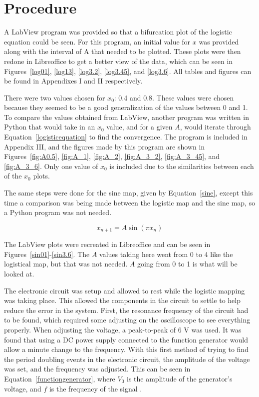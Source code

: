 \documentclass[12pt]{report}
\theoremstyle{definition}
\begin{document}
%
%

\section*{Procedure}

A LabView program was provided so that a bifurcation plot of the logistic equation could be seen. For this program, an initial value for $x$ was provided along with the interval of A that needed to be plotted. These plots were then redone in Libreoffice to get a better view of the data, which can be seen in Figures~\ref{log01}, \ref{log13}, \ref{log3.2}, \ref{log3.45}, and \ref{log3.6}. All tables and figures can be found in Appendixes I and II respectively. 

There were two values chosen for $x_0$: 0.4 and 0.8. These values were chosen because they seemed to be a good generalization of the values between 0 and 1. To compare the values obtained from LabView, another program was written in Python that would take in an $x_0$ value, and for a given $A$, would iterate through Equation~\ref{logisticequation} to find the convergence. The program is included in Appendix III, and the figures made by this program are shown in Figures~\ref{fig:A0.5}, \ref{fig:A_1}, \ref{fig:A_2}, \ref{fig:A_3_2}, \ref{fig:A_3_45}, and \ref{fig:A_3_6}. Only one value of $x_0$ is included due to the similarities between each of the $x_0$ plots.

The same steps were done for the sine map, given by Equation~\ref{sine}, except this time a comparison was being made between the logistic map  and the sine map, so a Python program was not needed. 

\begin{equation}
x_{n+1}=A\sin{(\pi x_n)}
\label{sine}
\end{equation}

The LabView plots were recreated in Libreoffice and can be seen in Figures~\ref{sin01}-\ref{sin3.6}. The $A$ values taking here went from 0 to 4 like the logistical map, but that was not needed. $A$ going from 0 to 1 is what will be looked at. 

The electronic circuit was setup and allowed to rest while the logistic mapping was taking place. This allowed the components in the circuit to settle to help reduce the error in the system. First, the resonance frequency of the circuit had to be found, which required some adjusting on the oscilloscope to see everything properly. When adjusting the voltage, a peak-to-peak of 6 V was used. It was found that using a DC power supply connected to the function generator would allow a minute change to the frequency. With this first method of trying to find the period doubling events in the electronic circuit, the amplitude of the voltage was set, and the frequency was adjusted. This can be seen in Equation~\ref{functiongenerator}, where $V_0$ is the amplitude of the generator's voltage, and $f$ is the frequency of the signal \cite{hilborn}.
\end{document}
